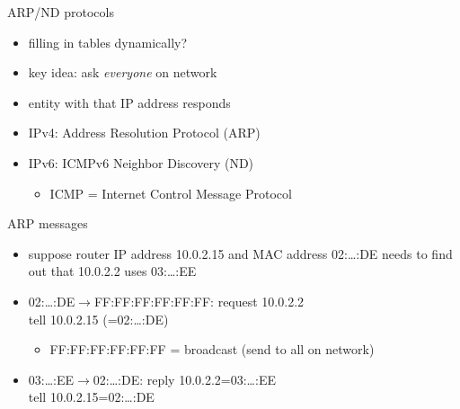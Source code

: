 \usetikzlibrary{arrows.meta,calc,fit,matrix,shapes}
\begin{frame}{ARP/ND protocols}
    \begin{itemize}
    \item filling in tables dynamically?
    \item key idea: ask \textit{everyone} on network
    \item entity with that IP address responds
    \vspace{.5cm}
    \item IPv4: Address Resolution Protocol (ARP)
    \item IPv6: ICMPv6 Neighbor Discovery (ND)
        \begin{itemize}
        \item ICMP = Internet Control Message Protocol
        \end{itemize}
    \end{itemize}
\end{frame}

\begin{frame}{ARP messages}
\begin{itemize}
\item suppose router IP address 10.0.2.15 and MAC address 02:\ldots:DE needs to find out
    that 10.0.2.2 uses 03:\ldots:EE
\vspace{.5cm}
\item 02:\ldots:DE$\rightarrow$FF:FF:FF:FF:FF:FF: request 10.0.2.2 \\
      tell 10.0.2.15 (=02:\ldots:DE)
    \begin{itemize}
    \item FF:FF:FF:FF:FF:FF = broadcast (send to all on network)
    \end{itemize}
\item 03:\ldots:EE$\rightarrow$02:\ldots:DE: reply 10.0.2.2=03:\ldots:EE
    \\ tell 10.0.2.15=02:\ldots:DE
\end{itemize}
\end{frame}

